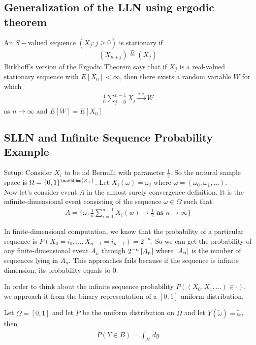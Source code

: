   


\subsection{Generalization of the LLN using ergodic theorem} 
An $S-$valued sequence $(X_j: j \geq 0)$ is stationary if 
    \begin{align*}
        (X_{n+j}) \overset{D}{=} (X_j)
    \end{align*}
Birkhoff's version of the Ergodic Theorem says that if $X_j$ is a real-valued stationary sequence with $E[X_0] < \infty$, then there exists a random variable $W$ for which 
    \begin{align*}
        \frac{1}{n} \sum_{j=0}^{n-1}X_j \overset{a.s.}{\to} W
    \end{align*}
as $n\to \infty$ and $E[W] = E[X_0]$
    
\subsection{SLLN and Infinite Sequence Probability Example} 
Setup: Consider $X_i$ to be iid Bernulli with parameter $\frac{1}{2}$. So the natural sample space is $\Omega = \{ 0, 1\}^{\mathbbm{Z_+}}$. Let $X_i(\omega) = \omega_i$ where $\omega = (\omega_0, \omega_1, ...)$. \\


Now let's consider event $A$ in the almost surely convergence definition. It is the infinite-dimensional event consisting of the sequence $\omega \in \Omega$ such that:  
    \begin{align*}
        A = \{ \omega : \frac{1}{n} \sum_{i=0}^{n-1} X_i(w) \to \frac{1}{2} \textbf{ as } n \to \infty \}
    \end{align*}

In finite-dimensional computation, we know that the probability of a particular sequence is  $P(X_0 = i_0, ..., X_{n-1} = i_{n-1}) = 2^{-n}$. So we can get the probability of any finite-dimensional event $A_n$ through $2^{-n} \left| A_n \right|$ where $\left| A_n \right|$ is the number of sequences lying in $A_n$. This approaches fails because if the sequence is infinite dimension, its probability equals to 0. 


In order to think about the infinite sequence probability $P((X_0, X_1, ...) \in \cdot)$, we approach it from the binary representation of a $[0,1]$ uniform distribution. 

Let $\tilde{\Omega} = [0,1]$ and let $\tilde{P}$ be the uniform distribution on $\tilde{\Omega}$ and let $Y(\tilde{\omega}) = \tilde{\omega}$, then 
    \begin{align*}
        \tilde{P}(Y \in B) = \int_B \, dy
    \end{align*}
    
